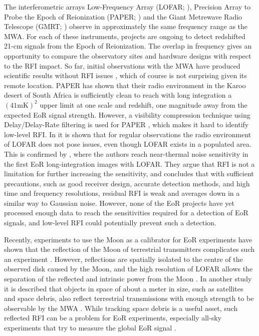 \documentclass{pasa}
\begin{document}
The interferometric arrays Low-Frequency Array (LOFAR; \citealt{lofar-2013}), Precision Array to Probe the Epoch of Reionization (PAPER; \citealt{parsons-paper-eorlimit-2014}) and the Giant Metrewave Radio Telescope (GMRT; \citealt{the-gmrt-swarup-chapter-2013}) observe in approximately the same frequency range as the MWA. For each of these instruments, projects are ongoing to detect redshifted 21-cm signals from the Epoch of Reionization. The overlap in frequency gives an opportunity to compare the observatory sites and hardware designs with respect to the RFI impact. So far, initial observations with the MWA have produced scientific results without RFI issues \citep{mwacs-2014, mckinley-fornaxa-2014, hindson-cluster-emission-2014}, which of course is not surprising given its remote location. PAPER has shown that their radio environment in the Karoo desert of South Africa is sufficiently clean to reach with long integration a $(41 \textrm{mK})^2$ upper limit at one scale and redshift, one magnitude away from the expected EoR signal strength. However, a visibility compression technique using Delay/Delay-Rate filtering is used for PAPER \citep{parsons-paper-eorlimit-2014}, which makes it hard to identify low-level RFI. In \citet{lofar-radio-environment} it is shown that for regular observations the radio environment of LOFAR does not pose issues, even though LOFAR exists in a populated area. This is confirmed by \citet{ncp-eor-yatawatta}, where the authors reach near-thermal noise sensitivity in the first EoR long-integration images with LOFAR. They argue that RFI is not a limitation for further increasing the sensitivity, and \citet{offringa-rfi-distributions} concludes that with sufficient precautions, such as good receiver design, accurate detection methods, and high time and frequency resolutions, residual RFI is weak and averages down in a similar way to Gaussian noise. However, none of the EoR projects have yet processed enough data to reach the sensitivities required for a detection of EoR signals, and low-level RFI could potentially prevent such a detection.

Recently, experiments to use the Moon as a calibrator for EoR experiments have shown that the reflection of the Moon of terrestrial transmitters complicates such an experiment \citep{mckinley-moon-2013}. However, reflections are spatially isolated to the centre of the observed disk caused by the Moon, and the high resolution of LOFAR allows the separation of the reflected and intrinsic power from the Moon \citep{vedantham-2014-todo}. In another study it is described that objects in space of about a meter in size, such as satellites and space debris, also reflect terrestrial transmissions with enough strength to be observable by the MWA \citep{tingay-space-debris-2013}. While tracking space debris is a useful asset, such reflected RFI can be a problem for EoR experiments, especially all-sky experiments that try to measure the global EoR signal \citep{vedantham-2014-todo}.
\end{document}

